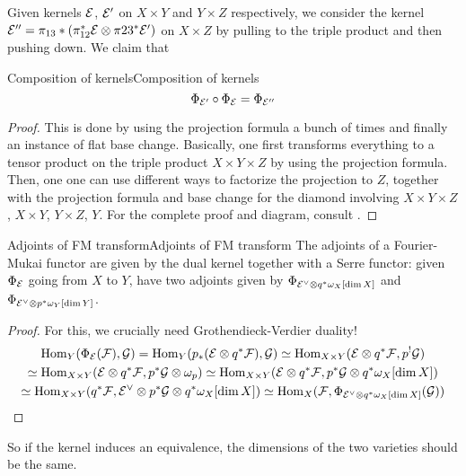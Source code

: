Given kernels $\mathcal{E}$, $\mathcal{E}'$ on $X\times Y$ and $Y\times Z$ respectively, we consider the kernel $\mathcal{E}''=\pi_{13}*(\pi_{12}^*\mathcal{E}\otimes\pi{23}^*\mathcal{E}')$ on $X\times Z$ by pulling to the triple product and then pushing down. We claim that
\begin{proposition}{Composition of kernels}{Composition of kernels}
\begin{equation*}
    \Phi_{\mathcal{E}'}\circ\Phi_{\mathcal{E}} = \Phi_{\mathcal{E}''}
\end{equation*}
\end{proposition}
\begin{proof}
    This is done by using the projection formula a bunch of times and finally an instance of flat base change. Basically, one first transforms everything to a tensor product on the triple product $X\times Y \times Z$ by using the projection formula. Then, one one can use different ways to factorize the projection to $Z$, together with the projection formula and base change for the diamond involving $X\times Y \times Z$, $X\times Y$, $Y\times Z$, $Y$. For the complete proof and diagram, consult \cite[\S5][Proposition~5.10]{Huybrechts}.
\end{proof}

\begin{proposition}{Adjoints of FM transform}{Adjoints of FM transform}
    The adjoints of a Fourier-Mukai functor are given by the dual kernel together with a Serre functor: given $\Phi_{\mathcal{E}}$ going from $X$ to $Y$, have two adjoints given by $\Phi_{\mathcal{E}^\vee\otimes q^*\omega_{X}[\dim X]}$ and $\Phi_{\mathcal{E}^\vee\otimes p^* \omega_{Y}[\dim Y]}$.
\end{proposition}
\begin{proof}
For this, we crucially need Grothendieck-Verdier duality!
\begin{gather*}
    \operatorname{Hom}_Y(\Phi_{\mathcal{E}}(\mathcal{F}),\mathcal{G})
        = \operatorname{Hom}_Y(p_*(\mathcal{E}\otimes q^*\mathcal{F}),\mathcal{G})
        \simeq \operatorname{Hom}_{X\times Y}(\mathcal{E}\otimes q^*\mathcal{F},p^!\mathcal{G}) \\
        \simeq \operatorname{Hom}_{X\times Y}(\mathcal{E}\otimes q^*\mathcal{F},p^*\mathcal{G}\otimes\omega_p)
        \simeq \operatorname{Hom}_{X\times Y}(\mathcal{E}\otimes q^*\mathcal{F},p^*\mathcal{G}\otimes q^*\omega_X[\dim X]) \\
        \simeq \operatorname{Hom}_{X\times Y}(q^*\mathcal{F},\mathcal{E}^\vee\otimes p^*\mathcal{G}\otimes q^* \omega_X[\dim X])
        \simeq \operatorname{Hom}_X(\mathcal{F},\Phi_{\mathcal{E}^\vee\otimes q^*\omega_X[\dim X]}(\mathcal{G}))
\end{gather*}
\end{proof}
So if the kernel induces an equivalence, the dimensions of the two varieties should be the same.

